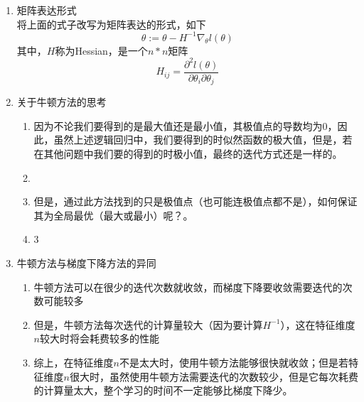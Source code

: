 \begin{enumerate}
	\item 矩阵表达形式 \\
	将上面的式子改写为矩阵表达的形式，如下
	\begin{equation}
		\theta := \theta - H^{-1}\nabla_{\theta}l(\theta)
	\end{equation}
	其中，$H$称为Hessian，是一个$n*n$矩阵
	\begin{equation}
		H_{ij} = \frac{\partial^2l(\theta)}{\partial\theta_i\partial\theta_j}
	\end{equation}

	\item 关于牛顿方法的思考
	\begin{enumerate}
		\item 因为不论我们要得到的是最大值还是最小值，其极值点的导数均为$0$，因此，虽然上述逻辑回归中，我们要得到的时似然函数的极大值，但是，若在其他问题中我们要的得到的时极小值，最终的迭代方式还是一样的。
		\item \item 但是，通过此方法找到的只是极值点（也可能连极值点都不是），如何保证其为全局最优（最大或最小）呢？。{\color{red}{此项待研究。。}}
		\item 3
	\end{enumerate}

	\item 牛顿方法与梯度下降方法的异同
	\begin{enumerate}
		\item 牛顿方法可以在很少的迭代次数就收敛，而梯度下降要收敛需要迭代的次数可能较多
		\item 但是，牛顿方法每次迭代的计算量较大（因为要计算$H^{-1}$），这在特征维度$n$较大时将会耗费较多的性能
		\item 综上，在特征维度$n$不是太大时，使用牛顿方法能够很快就收敛；但是若特征维度$n$很大时，虽然使用牛顿方法需要迭代的次数较少，但是它每次耗费的计算量太大，整个学习的时间不一定能够比梯度下降少。
	\end{enumerate}
\end{enumerate}














